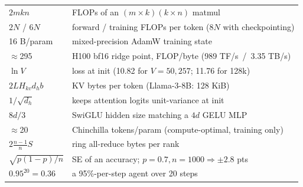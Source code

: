 \begin{mem}
\begin{tabularx}{\linewidth}{@{}lL@{}}
$2mkn$ & FLOPs of an $(m{\times}k)(k{\times}n)$ matmul\\
$2N$ / $6N$ & forward / training FLOPs per token ($8N$ with checkpointing)\\
16 B/param & mixed-precision AdamW training state\\
$\approx$295 & H100 bf16 ridge point, FLOP/byte (989 TF/s \,/\, 3.35 TB/s)\\
$\ln V$ & loss at init (10.82 for $V{=}50{,}257$; 11.76 for 128k)\\
$2LH_{kv}d_h b$ & KV bytes per token (Llama-3-8B: 128 KiB)\\
$1/\sqrt{d_h}$ & keeps attention logits unit-variance at init\\
$8d/3$ & SwiGLU hidden size matching a $4d$ GELU MLP\\
$\approx$20 & Chinchilla tokens/param (compute-optimal, training only)\\
$2\frac{n-1}{n}S$ & ring all-reduce bytes per rank\\
$\sqrt{p(1{-}p)/n}$ & SE of an accuracy; $p{=}0.7,n{=}1000\Rightarrow\pm2.8$ pts\\
$0.95^{20}=0.36$ & a 95\%-per-step agent over 20 steps\\
\end{tabularx}
\end{mem}

{\small\tableofcontents}
